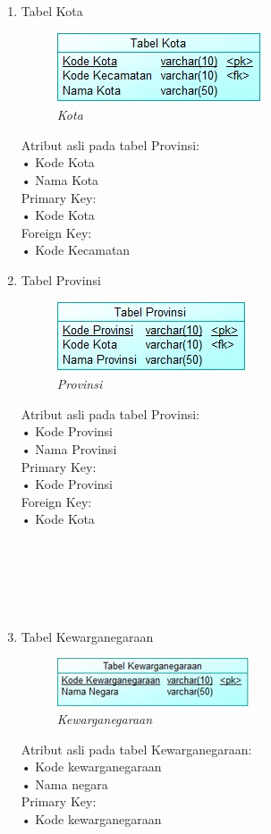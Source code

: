 \documentclass[12pt,a4paper,bahasa]{article}
\begin{document}
\begin{enumerate}
\item Tabel Kota\\
\begin{figure}[!htbp]
\centering
\includegraphics[scale=1.0]{gambar/Kota.jpeg}
\caption{\textit{Kota}}
\label{Kota}
\end{figure}
Atribut asli pada tabel Provinsi:\\
•	Kode Kota\\
•	Nama Kota\\
Primary Key:\\
•	Kode Kota\\
Foreign Key:\\
•	Kode Kecamatan

\item Tabel Provinsi\\
\begin{figure}[!htbp]
\centering
\includegraphics[scale=1.0]{gambar/Provinsi.jpeg}
\caption{\textit{Provinsi}}
\label{Provinsi}
\end{figure}
Atribut asli pada tabel Provinsi:\\ 
•	Kode Provinsi\\
•	Nama Provinsi\\
Primary Key:\\
•	Kode Provinsi\\
Foreign Key:\\
•	Kode Kota
\\
\\
\\
\\
\\
\\
\item Tabel Kewarganegaraan\\
\begin{figure}[!htbp]
\centering
\includegraphics[scale=0.8]{gambar/Kewarganegaraan.png}
\caption{\textit{Kewarganegaraan}}
\label{Kewarganegaraan}
\end{figure}
Atribut asli pada tabel Kewarganegaraan:\\
•	Kode kewarganegaraan\\
•	Nama negara \\
Primary Key:\\
•	Kode kewarganegaraan


\end{enumerate}
\end{document}
